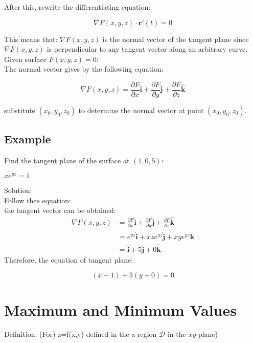 \documentclass[UTF8,a4paper, 10pt, openany]{svmono}
\begin{document}
After this, rewrite the differentiating equation:

\begin{equation}
\boxed{
\nabla F(x,y,z)\cdot \mathbf{r}'(t)=0
}
\end{equation}

This means that: $\nabla F(x,y,z)$ is the normal vector of the tangent plane since $\nabla F(x,y,z)$ is perpendicular to any tangent vector along an arbitrary curve.\\ 

Given surface $F(x,y,z)=0$:\\

The normal vector gives by the following equation:

\begin{equation}
\boxed{
\nabla F(x,y,z)=\frac{\partial F}{\partial x}\mathbf{\hat{i}}+\frac{\partial F}{\partial y}\mathbf{\hat{j}}+\frac{\partial F}{\partial z}\mathbf{\hat{k}}
}
\end{equation}

substitute $(x_0,y_0,z_0)$ to determine the normal vector at point $(x_0,y_0,z_0)$.

\subsection{Example}
Find the tangent plane of the surface at $(1,0,5)$:
\begin{center}
$xe^{yz}=1$
\end{center}
Solution:\\
Follow thee equation:\\
the tangent vector can be obtained:
\begin{align*}
\nabla F(x,y,z)&=\frac{\partial F}{\partial x}\mathbf{\hat{i}}+\frac{\partial F}{\partial y}\mathbf{\hat{j}}+\frac{\partial F}{\partial z}\mathbf{\hat{k}}\\
&= e^{yz}\mathbf{\hat{i}}+xze^{yz}\mathbf{\hat{j}}+xye^{yz}\mathbf{\hat{k}}\\
&= \mathbf{\hat{i}}+5\mathbf{\hat{j}}+0\mathbf{\hat{k}}
\end{align*}
Therefore, the equation of tangent plane:

\[(x-1)+5(y-0)=0\]

\section{Maximum and Minimum Values}
Definition: (For) z=f(x,y) defined in the a region $\mathcal{D}$ in the $xy$-plane)
\end{document}
